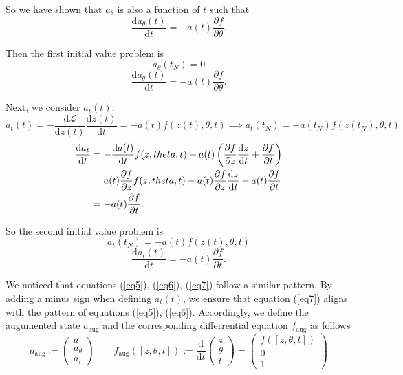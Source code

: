 \documentclass[a4paper,11pt,titlepage]{article}
\theoremstyle{definition}
\theoremstyle{plain}
\theoremstyle{remark}
\begin{document}
So we have shown that $a_{\theta}$ is also a function of $t$ such that $$\frac{\mathrm{d}a_{\theta}(t)}{\mathrm{d}t} = -a(t)\frac{\partial f}{\partial \theta}.$$

Then the first initial value problem is 
$$a_\theta(t_N)=0$$
\begin{equation}\label{eq6}
    \frac{\mathrm{d}a_{\theta}(t)}{\mathrm{d}t} = -a(t)\frac{\partial f}{\partial \theta}. \tag{6}
\end{equation}

Next, we consider $a_t(t)$:
$$
a_t(t) = -\frac{\mathrm{d}\mathcal{L}}{\mathrm{d} z(t)}\frac{\mathrm{d} z(t)}{\mathrm{d}t}=-a(t)f(z(t),\theta, t)\implies a_t(t_N) = -a(t_N)f(z(t_N),\theta, t)
$$
\begin{align}
\frac{\mathrm{d}a_t}{\mathrm{d}t}&=-\frac{\mathrm{d}a(t)}{\mathrm{d}t}f(z,\theta,t)-a(t)\left(\frac{\partial f}{\partial z}\frac{\mathrm{d}z}{\mathrm{d}t}+\frac{\partial f}{\partial t}\right)\notag\\
&=a(t)\frac{\partial f}{\partial z}f(z,\theta,t)-a(t)\frac{\partial f}{\partial z}\frac{\mathrm{d}z}{\mathrm{d}t}-a(t)\frac{\partial f}{\partial t}\notag\\
&=-a(t)\frac{\partial f}{\partial t}.\notag
\end{align}

So the second initial value problem is 
$$a_t(t_N)=-a(t)f(z(t),\theta,t)$$
\begin{equation}\label{eq7}
    \frac{\mathrm{d}a_t(t)}{\mathrm{d}t} = -a(t)\frac{\partial f}{\partial t}. \tag{7}
\end{equation}

We noticed that equations (\ref{eq5}), (\ref{eq6}), (\ref{eq7}) follow a similar pattern. By adding a minus sign when defining $a_t(t)$, we ensure that equation (\ref{eq7}) aligns with the pattern of equations (\ref{eq5}), (\ref{eq6}). Accordingly, we define the augumented state $a_{\mathrm{aug}}$ and the corresponding differrential equation $f_{\mathrm{aug}}$ as follows
$$a_{\mathrm{aug}}:= \begin{pmatrix}a\\ a_\theta\\ a_t\end{pmatrix}\quad\quad f_{\mathrm{aug}}\left([z,\theta,t]\right):=\frac{\mathrm{d}}{\mathrm{d}t}\begin{pmatrix}z\\\theta\\ t\end{pmatrix}=\begin{pmatrix}f([z,\theta,t])\\0\\1\end{pmatrix}$$
\end{document}
